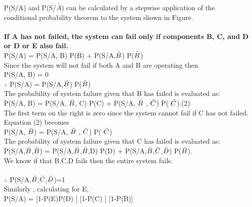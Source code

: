 \documentclass{article}
\begin{document}
\begin{itemize}
\begin{itemize}
    P(S/A) and P(S/$\bar{A}$) can be calculated by  a stepwise application of the conditional probability theorem to the system shown in Figure.\\ \\
    \textbf{If A has not failed, the system can fail only if components B, C, and D or D or E also fail.}\\\vspace{5mm}
    \hspace{15mm}P(S/A) = P(S/A, B) P(B) + P(S/A,$\Bar{B}$) P($\Bar{B}$) \\
    Since the system will not fail if both A and B are operating then \\\vspace{5mm}
\hspace{15mm}P(S/A, B) = 0 \\ \vspace{5mm}
\hspace{15mm}$\therefore$  P(S/A) =  P(S/A,$\Bar{B}$) P($\Bar{B}$) \\
The probability of system failure given that B has failed is evaluated
as:\\ \vspace{5mm}
\hspace{15mm}P(S/A, B) = P(S/A, $\Bar{B}$, C) P(C) + P(S/A, $\Bar{B}$ , $\Bar{C}$) P( $\Bar{C}$).\hspace{30mm}(2) \\ 
The first term on the right is zero since the system cannot fail if C
has not failed. Equation (2) becomes \\ \vspace{5mm}
\hspace{15mm}P(S/A, $\Bar{B}$) =  P(S/A, $\Bar{B}$ , $\Bar{C}$) P( $\Bar{C}$)\\
The probability of system failure given that C has failed is evaluated
as:\\ \vspace{5mm}
\hspace{15mm}P(S/A,$\Bar{B}$,$\Bar{B}$) = P(S/A,$\Bar{B}$,$\Bar{B}$,D) P(D) + P(S/A,$\Bar{B}$,$\Bar{C}$,$\Bar{D}$) P($\Bar{B}$).  \\
We know if that B,C,D fails then the entire system fails. \\
\\ \vspace{2mm}
\hspace{15mm}$\therefore$ P(S/A,$\Bar{B}$,$\Bar{C}$,$\Bar{D}$)=1 \\
Similarly , calculating for E,\\ \vspace{5mm}
\hspace{15mm}P(S/A) = [1-P(E)P(D) ] [1-P(C) ] [1-P(B)]\\


\end{itemize}
\end{itemize}
\end{document}

